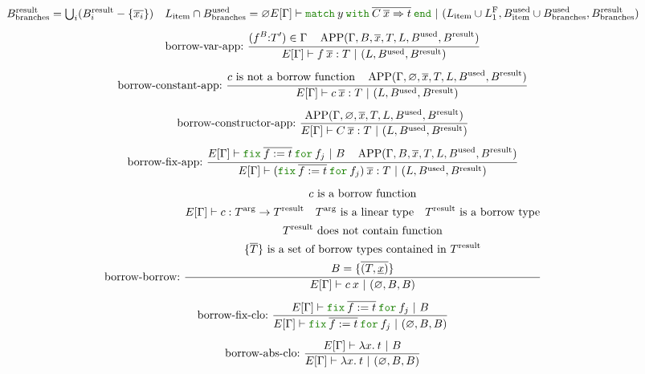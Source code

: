 \documentclass[a4paper,fleqn]{article}
\newcommand{\kwmatch}{\mbox{\color{mygreen}\ttfamily match}}
\newcommand{\kwwith}{\mbox{\color{mygreen}\ttfamily with}}
\newcommand{\kwend}{\mbox{\color{mygreen}\ttfamily end}}
\newcommand{\kwfix}{\mbox{\color{mygreen}\ttfamily fix}}
\newcommand{\kwfor}{\mbox{\color{mygreen}\ttfamily for}}
\newcommand{\lam}[2]{\lambda #1.\:#2}
\newcommand{\lassum}[2]{(#1\mathord{:}#2)}
\newcommand{\omatch}[2]{\kwmatch\:#1\:\kwwith\:{#2}\:\kwend}
\newcommand{\ofix}[2]{\kwfix\:{#1}\:\kwfor\:{#2}}
\newcommand{\tbigcup}{{\textstyle\bigcup}}
\newcommand{\breakrule}{\\[0.5em]}
\DeclareMathOperator{\APP}{APP}
\newcommand{\rep}[1]{\overline{#1}}
\begin{document}
\begin{gather*}
{\begin{gathered}
        B^\text{result}_\text{branches} = \tbigcup_i (B^\text{result}_i - \{\rep{x_i}\}) \quad
        L_\text{item} \cap B^\text{used}_\text{branches} = \varnothing \\
      \end{gathered}
    }{
      E[\Gamma] \vdash \omatch{y}{\rep{C\: \rep{x} \Rightarrow t}} ~|~ (L_\text{item} \cup L^\text{F}_1, B^\text{used}_\text{item} \cup B^\text{used}_\text{branches}, B^\text{result}_\text{branches})
    } \breakrule
  \text{borrow-var-app:}~
    \dfrac{
      \begin{gathered}
        \lassum{f^{B}}{T'} \in \Gamma \quad
        \APP(\Gamma, B, \rep{x}, T, L, B^\text{used}, B^\text{result})
      \end{gathered}
    }{
      E[\Gamma] \vdash f\:\rep{x} : T ~|~ (L, B^\text{used}, B^\text{result})
    } \breakrule
  \text{borrow-constant-app:}~
    \dfrac{
      \begin{gathered}
        \text{$c$ is not a borrow function} \quad
        \APP(\Gamma, \varnothing, \rep{x}, T, L, B^\text{used}, B^\text{result})
      \end{gathered}
    }{
      E[\Gamma] \vdash c\:\rep{x} : T ~|~ (L, B^\text{used}, B^\text{result})
    } \breakrule
  \text{borrow-constructor-app:}~
    \dfrac{
      \APP(\Gamma, \varnothing, \rep{x}, T, L, B^\text{used}, B^\text{result})
    }{
      E[\Gamma] \vdash C\: \rep{x} : T ~|~ (L, B^\text{used}, B^\text{result})
    } \breakrule
  \text{borrow-fix-app:}~
    \dfrac{
      \begin{gathered}
        E[\Gamma] \vdash \ofix{\rep{f:=t}}{f_j} ~|~ B \quad
        \APP(\Gamma, B, \rep{x}, T, L, B^\text{used}, B^\text{result})
      \end{gathered}
    }{
      E[\Gamma] \vdash (\ofix{\rep{f:=t}}{f_j})\:\rep{x} : T ~|~ (L, B^\text{used}, B^\text{result})
    } \breakrule
  \text{borrow-borrow:}~
    \dfrac{
      \begin{gathered}
        \text{$c$ is a borrow function} \\
        E[\Gamma] \vdash c : T^\text{arg} \rightarrow T^\text{result} \quad
        \text{$T^\text{arg}$ is a linear type} \quad
        \text{$T^\text{result}$ is a borrow type} \\
        \text{$T^\text{result}$ does not contain function} \\
        \text{$\{\rep{T}\}$ is a set of borrow types contained in $T^\text{result}$} \\
        B = \{\rep{(T,\underline{x})}\}
      \end{gathered}
    }{
      E[\Gamma] \vdash c\:x ~|~ (\varnothing, B, B)
    } \breakrule
  \text{borrow-fix-clo:}~
    \dfrac{
      E[\Gamma] \vdash \ofix{\rep{f:=t}}{f_j} ~|~ B
    }{
      E[\Gamma] \vdash \ofix{\rep{f:=t}}{f_j} ~|~ (\varnothing, B, B)
    } \breakrule
  \text{borrow-abs-clo:}~
    \dfrac{
      E[\Gamma] \vdash \lam{x}{t} ~|~ B
    }{
      E[\Gamma] \vdash \lam{x}{t} ~|~ (\varnothing, B, B)
    }
\end{gather*}
\end{document}
